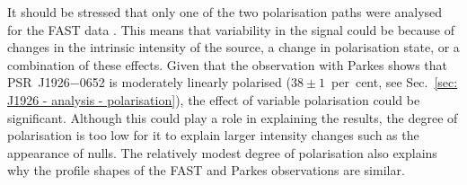 It should be stressed that only one of the two polarisation paths were analysed for the FAST data \citep{ZLH+2019}. This means that variability in the signal could be because of changes in the intrinsic intensity of the source, a change in polarisation state, or a combination of these effects. Given that the observation with Parkes shows that PSR~J1926$-$0652 is moderately linearly polarised ($38\pm 1$~per~cent, see Sec.~\ref{sec: J1926 - analysis - polarisation}), the effect of variable polarisation could be significant. Although this could play a role in explaining the results, the degree of polarisation is too low for it to explain larger intensity changes such as the appearance of nulls. The relatively modest degree of polarisation also explains why the profile shapes of the FAST and Parkes observations are similar.

